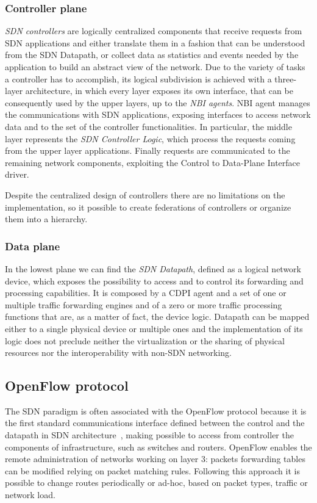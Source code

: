 \subsubsection{Controller plane}

\emph{SDN controllers} are logically centralized components that
receive requests from SDN applications and either translate them 
in a fashion that can be understood from the SDN Datapath, or collect 
data as statistics and events needed by the application to build an abstract
view of the network.  Due to the variety of tasks a controller has to
accomplish, its logical subdivision is achieved with a three-layer architecture,
in which every layer exposes its own interface, that can be consequently used by
the upper layers, up to the \emph{NBI agents}.
NBI agent manages the communications with SDN applications, exposing interfaces
to access network data and to the set of the controller functionalities.
In particular, the middle layer represents the \emph{SDN Controller Logic},
which process the requests coming from the upper layer applications. Finally
requests are communicated to the remaining network components, exploiting the
Control to Data-Plane Interface driver.

Despite the centralized design of controllers there are no limitations on the
implementation, so it possible to create federations of controllers or organize
them into a hierarchy.

\subsubsection{Data plane}
In the lowest plane we can find the \emph{SDN Datapath}, defined as a logical
network device, which exposes the possibility to access and to control its
forwarding and processing capabilities. It is composed by a CDPI agent and a set
of one or multiple traffic forwarding engines and of a zero or more traffic
processing functions that are, as a matter of fact, the device logic. Datapath
can be mapped either to a single physical device or multiple ones and the
implementation of its logic does not preclude neither the virtualization or
the sharing of physical resources nor the interoperability with non-SDN
networking.

\subsection{OpenFlow protocol}
The SDN paradigm is often associated with the OpenFlow protocol because it is
the first standard communications interface defined between the control and the
datapath in SDN architecture~\cite{fundation2013software}, making possible to
access from controller the components of infrastructure, such as switches and
routers. OpenFlow enables the remote administration of networks working on 
layer 3: packets forwarding tables can be modified relying on packet matching 
rules. Following this approach it is possible to change routes periodically or 
ad-hoc, based on packet types, traffic or network load.

